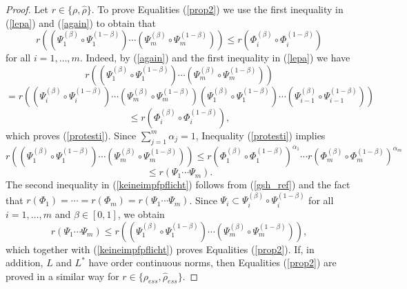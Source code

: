 \documentclass[12pt, reqno]{amsart}
\theoremstyle{definition}
\theoremstyle{remark}
\numberwithin{equation}{section}
\newcommand{\be}{\begin{equation}}
\newcommand{\ee}{\end{equation}}
\begin{document}
\begin{proof}
Let $r\in \{ \rho, \hat{\rho}\}$. To prove Equalities (\ref{prop2}) we use the first inequality in (\ref{lepa}) and (\ref{again}) %
to obtain that %
\be
r\left(\left(\Psi_1^{(\beta)}\circ\Psi_1^{(1-\beta)}\right)
\cdots\left(\Psi_m^{(\beta)}\circ\Psi_m^{(1-\beta)}\right)\right)\le r\left(\Phi_i^{(\beta)}\circ\Phi_i^{(1-\beta)}\right)
\label{protesti}
\ee
 for all $i=1,\ldots , m$. Indeed, 
by (\ref{again}) and the first inequality in (\ref{lepa}) we have
$$r((\Psi_1^{(\beta)}\circ\Psi_1^{(1-\beta)})
\cdots(\Psi_m^{(\beta)}\circ\Psi_m^{(1-\beta)})) $$
$$= r((\Psi_i^{(\beta)}\circ\Psi_i^{(1-\beta)})
\cdots(\Psi_m^{(\beta)}\circ\Psi_m^{(1-\beta)})(\Psi_1^{(\beta)}\circ\Psi_1^{(1-\beta)})\cdots(\Psi_{i-1}^{(\beta)}\circ\Psi_{i-1}^{(1-\beta)}))$$
$$\le  r(\Phi_i^{(\beta)}\circ\Phi_i^{(1-\beta)}),$$
which proves (\ref{protesti}).
Since $\sum_{j=1}^{m}\alpha_j=1$, Inequality (\ref{protesti}) implies 
\be
\nonumber
r((\Psi_1^{(\beta)}\circ\Psi_1^{(1-\beta)})
\cdots(\Psi_m^{(\beta)}\circ\Psi_m^{(1-\beta)}))\le r(\Phi_1^{(\beta)}\circ\Phi_1^{(1-\beta)})^{\alpha_1}\cdots r(\Phi_m^{(\beta)}\circ\Phi_m^{(1-\beta)})^{\alpha_m}
\ee
\be
\le r(\Psi_1\cdots\Psi_m). %
\label{keineimpfpflicht}
\ee
The second inequality in (\ref{keineimpfpflicht}) follows from (\ref{gsh_ref}) and the fact that $r(\Phi_1)=\cdots=r(\Phi_m)=r(\Psi_1\cdots\Psi_m)$. Since $\Psi_i\subset \Psi_i^{(\beta)}\circ\Psi_i^{(1-\beta)}$ for all $i=1,\ldots , m$ and $\beta\in [0,1]$, we obtain 
$$ r(\Psi_1\cdots\Psi_m) \le r((\Psi_1^{(\beta)}\circ\Psi_1^{(1-\beta)})\cdots(\Psi_m^{(\beta)}\circ\Psi_m^{(1-\beta)})),$$
which together with  (\ref{keineimpfpflicht}) proves Equalities (\ref{prop2}).
If, in addition, $L$ and $L^*$ have order continuous norms, then Equalities (\ref{prop2}) are proved in a similar way for $r\in \{\rho_{ess}, \hat{\rho} _{ess}\}$.
\end{proof}
\end{document}
